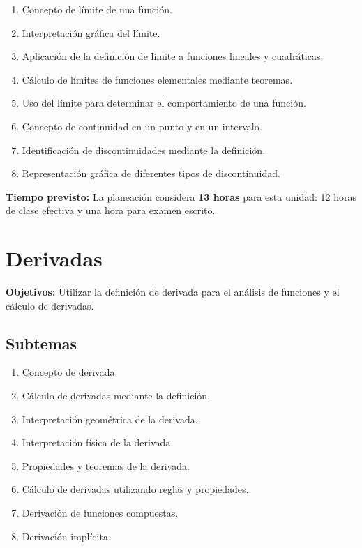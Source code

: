 \documentclass[12pt]{article}
\begin{document}
\begin{enumerate}
    \item Concepto de límite de una función.
    \item Interpretación gráfica del límite.
    \item Aplicación de la definición de límite a funciones lineales y cuadráticas.
    \item Cálculo de límites de funciones elementales mediante teoremas.
    \item Uso del límite para determinar el comportamiento de una función.
    \item Concepto de continuidad en un punto y en un intervalo.
    \item Identificación de discontinuidades mediante la definición.
    \item Representación gráfica de diferentes tipos de discontinuidad.
\end{enumerate}

\textbf{Tiempo previsto:} La planeaci\'on considera \textbf{13 horas} para esta unidad: 12 horas de clase efectiva y una hora para examen escrito.

\section{Derivadas}

\textbf{Objetivos:} Utilizar la definición de derivada para el análisis de funciones y el cálculo de derivadas.

\subsection{Subtemas}

\begin{enumerate}
    \item Concepto de derivada.
    \item Cálculo de derivadas mediante la definición.
    \item Interpretación geométrica de la derivada.
    \item Interpretación física de la derivada.
    \item Propiedades y teoremas de la derivada.
    \item Cálculo de derivadas utilizando reglas y propiedades.
    \item Derivación de funciones compuestas.
    \item Derivación implícita.
\end{enumerate}
\end{document}
